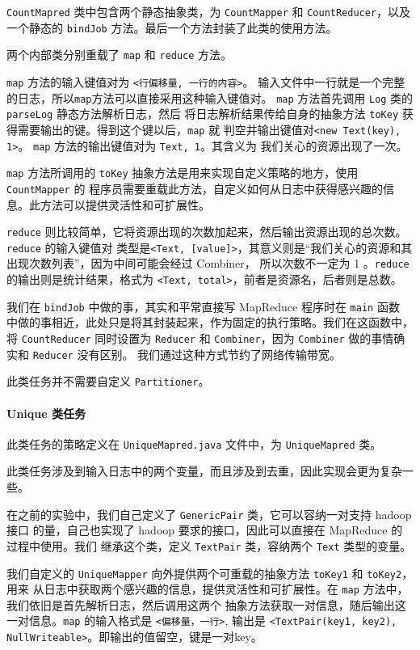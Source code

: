 \documentclass{article}
\begin{document}
  \verb|CountMapred| 类中包含两个静态抽象类，为 \verb|CountMapper| 和 \verb|CountReducer|，以及一个静态的
  \verb|bindJob| 方法。最后一个方法封装了此类的使用方法。

  两个内部类分别重载了 \verb|map| 和 \verb|reduce| 方法。
  
  \verb|map| 方法的输入键值对为 \verb|<行偏移量, 一行的内容>|。
  输入文件中一行就是一个完整的日志，所以\verb|map|方法可以直接采用这种输入键值对。
  \verb|map| 方法首先调用 \verb|Log| 类的 \verb|parseLog| 静态方法解析日志，然后
  将日志解析结果传给自身的抽象方法 \verb|toKey| 获得需要输出的键。得到这个键以后，\verb|map| 就
  判空并输出键值对\verb|<new Text(key), 1>|。 \verb|map| 方法的输出键值对为 \verb|Text, 1|。其含义为
  我们关心的资源出现了一次。

  \verb|map| 方法所调用的 \verb|toKey| 抽象方法是用来实现自定义策略的地方，使用 \verb|CountMapper| 的
  程序员需要重载此方法，自定义如何从日志中获得感兴趣的信息。此方法可以提供灵活性和可扩展性。

  \verb|reduce| 则比较简单，它将资源出现的次数加起来，然后输出资源出现的总次数。\verb|reduce| 的输入键值对
  类型是\verb|<Text, [value]>|，其意义则是``我们关心的资源和其出现次数列表''，因为中间可能会经过 Combiner，
  所以次数不一定为 1 。\verb|reduce| 的输出则是统计结果，格式为 \verb|<Text, total>|，前者是资源名，后者则是总数。

  我们在 \verb|bindJob| 中做的事，其实和平常直接写 MapReduce 程序时在 \verb|main| 函数
  中做的事相近，此处只是将其封装起来，作为固定的执行策略。我们在这函数中，将 \verb|CountReducer| 
  同时设置为 \verb|Reducer| 和 \verb|Combiner|，因为 \verb|Combiner| 做的事情确实和 \verb|Reducer| 没有区别。
  我们通过这种方式节约了网络传输带宽。

  此类任务并不需要自定义 \verb|Partitioner|。
  
  \paragraph{Unique 类任务} 此类任务的策略定义在 \verb|UniqueMapred.java| 文件中，为 \verb|UniqueMapred| 类。

  此类任务涉及到输入日志中的两个变量，而且涉及到去重，因此实现会更为复杂一些。
  
  在之前的实验中，我们自己定义了 \verb|GenericPair| 类，它可以容纳一对支持 hadoop 接口
  的量，自己也实现了 hadoop 要求的接口，因此可以直接在 MapReduce 的过程中使用。我们
  继承这个类，定义 \verb|TextPair| 类，容纳两个 \verb|Text| 类型的变量。

  我们自定义的 \verb|UniqueMapper| 向外提供两个可重载的抽象方法 \verb|toKey1| 和 \verb|toKey2|，用来
  从日志中获取两个感兴趣的信息，提供灵活性和可扩展性。在 \verb|map| 方法中，我们依旧是首先解析日志，然后调用这两个
  抽象方法获取一对信息，随后输出这一对信息。\verb|map| 的输入格式是 \verb|<偏移量，一行>|, 输出是
  \verb|<TextPair(key1, key2), NullWriteable>|。即输出的值留空，键是一对key。
\end{document}
